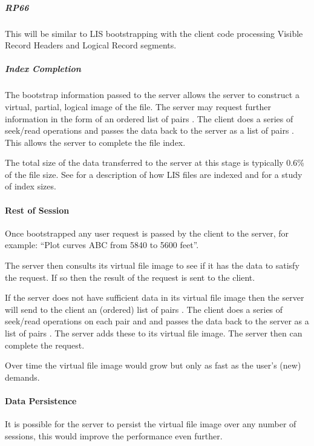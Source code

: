 \documentclass[letterpaper,10pt,english]{sphinxmanual}
\begin{document}
\subparagraph{RP66}
\label{\detokenize{tech/saas:rp66}}
This will be similar to LIS bootstrapping with the client code processing Visible Record Headers and Logical Record segments.


\subparagraph{Index Completion}
\label{\detokenize{tech/saas:index-completion}}
The bootstrap information passed to the server allows the server to construct a virtual, partial, logical image of the file. The server may request further information in the form of an ordered list of pairs . The client does a series of seek/read operations and passes the data back to the server as a list of pairs . This allows the server to complete the file index.

The total size of the data transferred to the server at this stage is typically 0.6\% of the file size. See {\hyperref[\detokenize{tech/LIS_indexing:totaldepth-tech-indexing}]{}} for a description of how LIS files are indexed and {\hyperref[\detokenize{tech/LIS_indexing:totaldepth-tech-indexing-indexsize}]{}} for a study of index sizes.


\paragraph{Rest of Session}
\label{\detokenize{tech/saas:rest-of-session}}
Once bootstrapped any user request is passed by the client to the server, for example: “Plot curves ABC from 5840 to 5600 feet”.

The server then consults its virtual file image to see if it has the data to satisfy the request. If so then the result of the request is sent to the client.

If the server does not have sufficient data in its virtual file image then the server will send to the client an (ordered) list of pairs . The client does a series of seek/read operations on each pair and and passes the data back to the server as a list of pairs . The server adds these to its virtual file image. The server then can complete the request.

Over time the virtual file image would grow but only as fast as the user’s (new) demands.


\paragraph{Data Persistence}
\label{\detokenize{tech/saas:data-persistence}}
It is possible for the server to persist the virtual file image over any number of sessions, this would improve the performance even further.
\end{document}
